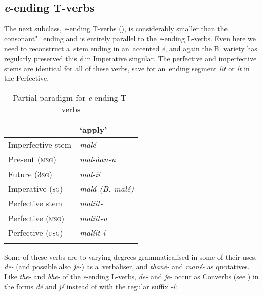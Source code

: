 \subsection{\textit{e}-ending T-verbs}
\label{subsec:8-3-6}


The next subclass, \textit{e}-ending T-verbs (), is considerably smaller than the consonant"=ending and is entirely parallel to the \textit{e}-ending L-verbs. Even here we need to reconstruct a~stem ending in an~accented \textit{é}, and again the B. variety has regularly preserved this \textit{é} in Imperative singular. The perfective and imperfective stems are identical for all of these verbs, save for an~ending segment \textit{íit} or \textit{ít} in the Perfective.


\begin{table}[ht]
\caption{Partial paradigm for \textit{e}-ending T-verbs}
\begin{tabularx}{.75\textwidth}{ Q Q }
\lsptoprule
&
`apply'\\\hline
Imperfective stem &
\textit{malé-}\\
Present (\textsc{msg}) &
\textit{mal-áan-u} \\
Future (\textsc{3sg}) &
\textit{mal-íi} \\
Imperative (\textsc{sg}) &
\textit{malá (B. malé)}\\
Perfective stem &
\textit{malíit-} \\
Perfective (\textsc{msg}) &
\textit{malíit-u} \\
Perfective (\textsc{fsg}) &
\textit{malíit-i} \\\lspbottomrule
\end{tabularx}
\label{tab:8-9}
\end{table}


Some of these verbs are to varying degrees grammaticalised in some of their uses, \textit{de-} (and possible also \textit{ǰe-}) as a~verbaliser, and \textit{thané-} and \textit{mané-} as quotatives. Like \textit{the-} and \textit{bhe-} of the \textit{e}-ending L-verbs, \textit{de-} and \textit{ǰe-} occur as Converbs (see ) in the forms \textit{dé} and \textit{ǰé} instead of with the regular suffix \textit{-í}:



